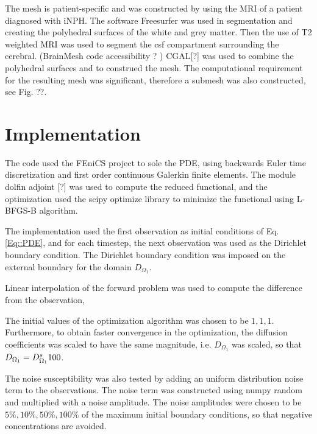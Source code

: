 \documentclass[11pt,a4paper]{article}
\begin{document}
The mesh is patient-specific and was constructed by using the MRI of a patient diagnosed with iNPH. The software Freesurfer was used in segmentation and creating the polyhedral surfaces of the white and grey matter. Then the use of T2 weighted MRI was used to segment the csf compartment surrounding the cerebral. (BrainMesh code accessibility ? ) CGAL[?] was used to combine the polyhedral surfaces and to construed the mesh. The computational requirement for the resulting mesh was significant, therefore a submesh was also constructed, see Fig. ??. 


\section*{Implementation}
The code used the FEniCS project to sole the PDE, using backwards Euler time discretization and first order continuous Galerkin finite elements. The module dolfin adjoint [?] was used to compute the reduced functional, and the optimization used the scipy optimize library to minimize the functional using L-BFGS-B algorithm.   

The implementation used the first observation as initial conditions of Eq.\ref{Eq::PDE}, and for each timestep, the next observation was used as the Dirichlet boundary condition. The Dirichlet boundary condition was imposed on the external boundary for the domain $D_{\Omega_1}$. 



Linear interpolation of the forward problem was used to compute the difference from the observation,

The initial values of the optimization algorithm was chosen to be $1,1,1$. Furthermore, to obtain faster convergence in the optimization, the diffusion coefficients was scaled to have the same magnitude, i.e.  $D_{\Omega_1}$ was scaled, so that $D_{\Omega_1} = D\sp {s}_{\Omega_1}100$.     


The noise susceptibility was also tested by adding an uniform distribution noise term to the observations. The noise term was constructed using numpy random and multiplied with a noise amplitude. The noise amplitudes were chosen to be $ 5\%, 10\%, 50\%, 100\%$ of the maximum initial boundary conditions, so that negative concentrations are avoided.  
\end{document}
